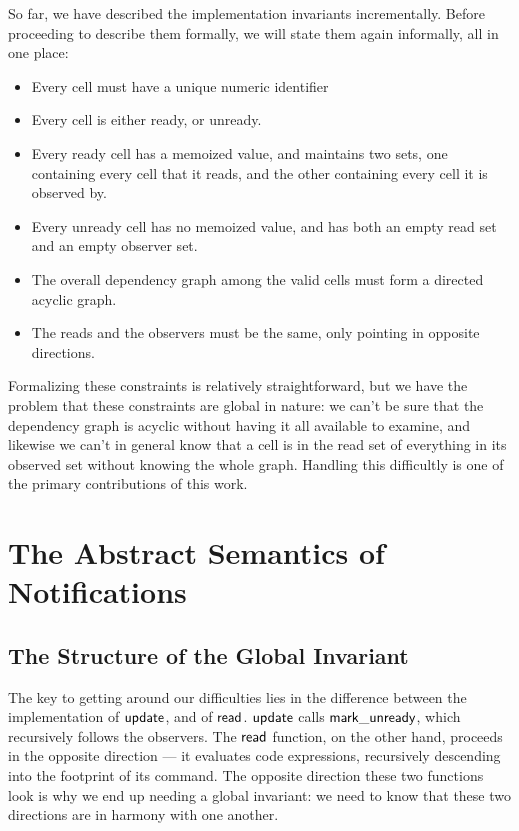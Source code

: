 So far, we have described the implementation invariants incrementally.
Before proceeding to describe them formally, we will state them again
informally, all in one place:

\begin{itemize}
  \item Every cell must have a unique numeric identifier
  \item Every cell is either ready, or unready. 
  \item Every ready cell has a memoized value, and maintains 
    two sets, one containing every cell that it reads, and the
    other containing every cell it is observed by. 
  \item Every unready cell has no memoized value, and has 
    both an empty read set and an empty observer set. 
  \item The overall dependency graph among the valid cells must form a
    directed acyclic graph. 
  \item The reads and the observers must be the same, only 
    pointing in opposite directions.
\end{itemize}

Formalizing these constraints is relatively straightforward, but we
have the problem that these constraints are global in nature:
we can't be sure that the dependency graph is acyclic without having
it all available to examine, and likewise we can't in general know
that a cell is in the read set of everything in its observed set
without knowing the whole graph. Handling this difficultly is one of
the primary contributions of this work. 

\section{The Abstract Semantics of Notifications}

\subsection{The Structure of the Global Invariant}

The key to getting around our difficulties lies in the difference
between the implementation of $\mathsf{update}$, and of $\mathsf{read}$.
$\mathsf{update}$ calls $\mathsf{mark\_unready}$, which recursively follows
the observers. The $\mathsf{read}$ function, on the other hand,
proceeds in the opposite direction --- it evaluates code expressions,
recursively descending into the footprint of its command. The opposite
direction these two functions look is why we end up needing a global
invariant: we need to know that these two directions are in harmony
with one another.

